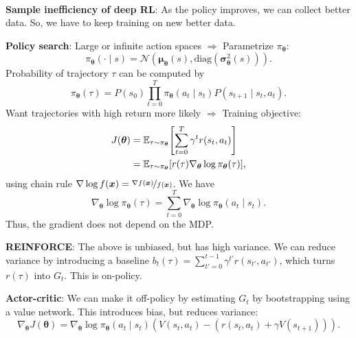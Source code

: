 \documentclass{article}
\newcommand{\lft}{\mathopen{}\mathclose\bgroup\left}
\newcommand{\rgt}{\aftergroup\egroup\right}
\newcommand{\E}{\mathbb{E}}
\renewcommand{\vec}[1]{\bm{#1}}
\newenvironment{topic}[1]
{\textbf{\sffamily \colorbox{black}{\rlap{\textbf{\textcolor{white}{#1}}}\hspace{\linewidth}\hspace{-2\fboxsep}}} \\ \vspace{0.2cm}}
{}
\begin{document}
\begin{multicols*}{2}
\begin{topic}{Reinforcement learning}
        \textbf{Sample inefficiency of deep RL}: As the policy improves, we can collect better data.
        So, we have to keep training on new better data.

        \textbf{Policy search}: Large or infinite action spaces $\Rightarrow$ Parametrize
        $\pi_{\vec{\theta}}$: \[
            \pi_{\vec{\theta}}(\cdot \mid s) = \mathcal{N}(\vec{\mu}_{\vec{\theta}}(s), \mathrm{diag}(\vec{\sigma}_{\vec{\theta}}^2(s))).
        \]
        Probability of trajectory $\tau$ can be computed by \[
            \pi_{\vec{\theta}}(\tau) = P(s_0) \prod_{t=0}^T \pi_{\vec{\theta}}(a_t \mid s_t) P(s_{t+1} \mid s_t, a_t).
        \]
        Want trajectories with high return more likely $\Rightarrow$ Training objective:
        \begin{align*}
            J(\vec{\theta}) & = \E_{\tau \sim \pi_{\vec{\theta}}} \lft[ \sum_{t=0}^{T} \gamma^t r(s_t, a_t) \rgt]                  \\
                            & = \E_{\tau \sim \pi_{\vec{\theta}}} [ r(\tau) \nabla_{\vec{\theta}} \log \pi_{\vec{\theta}}(\tau) ],
        \end{align*}
        using chain rule $\nabla \log f(\vec{x}) = \nicefrac{\nabla f(\vec{x})}{f(\vec{x})}$. We have \[
            \nabla_{\vec{\theta}} \log \pi_{\vec{\theta}}(\tau) = \sum_{t=0}^{T} \nabla_{\vec{\theta}} \log \pi_{\vec{\theta}}(a_t \mid s_t).
        \]
        Thus, the gradient does not depend on the MDP.

        \textbf{REINFORCE}: The above is unbiased, but has high variance. We can reduce variance by
        introducing a baseline $b_t(\tau) = \sum_{t'=0}^{t-1} \gamma^{t'} r(s_{t'}, a_{t'})$, which
        turns $r(\tau)$ into $G_t$. This is on-policy.

        \textbf{Actor-critic}: We can make it off-policy by estimating $G_t$ by bootstrapping using a value network. This introduces bias, but reduces variance: \[
            \nabla_{\vec{\theta}} J(\vec{\theta}) = \nabla_{\vec{\theta}} \log \pi_{\vec{\theta}} (a_t \mid s_t) (V(s_t, a_t) - (r(s_t, a_t) + \gamma V(s_{t+1}))).
        \]

    \end{topic}


\end{multicols*}
\end{document}
